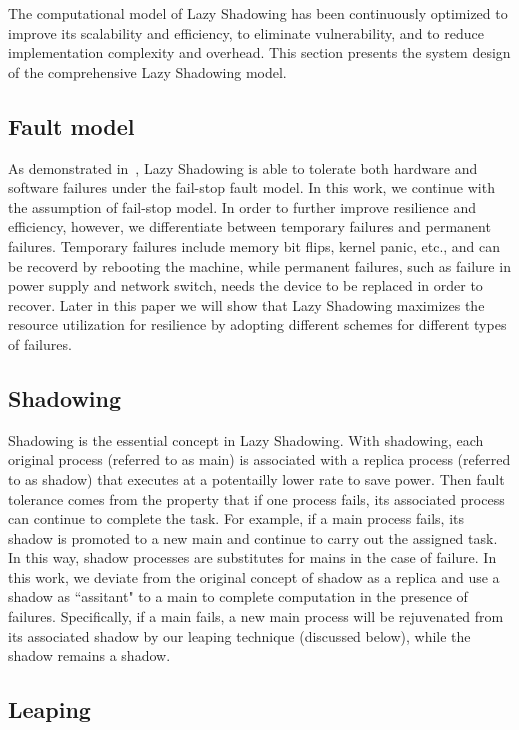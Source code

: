 The computational model of Lazy Shadowing has been continuously optimized to improve its scalability and efficiency, to eliminate vulnerability, and to reduce implementation complexity and overhead. This section presents the system design of the comprehensive Lazy Shadowing model. 

\subsection{Fault model}
 
As demonstrated in~\cite{cui_2016_scalcom}, Lazy Shadowing is able to tolerate both hardware and software failures under the fail-stop fault model. In this work, we continue with the assumption of fail-stop model. In order to further improve resilience and efficiency, however, we differentiate between temporary failures and permanent failures. Temporary failures include memory bit flips, kernel panic, etc., and can be recoverd by rebooting the machine, while permanent failures, such as failure in power supply and network switch, needs the device to be replaced in order to recover. Later in this paper we will show that Lazy Shadowing maximizes the resource utilization for resilience by adopting different schemes for different types of failures. 

\subsection{Shadowing}

Shadowing is the essential concept in  Lazy Shadowing. With shadowing, each original process (referred to as main) is associated with a replica process (referred to as shadow) that executes at a potentailly lower rate to save power. Then fault tolerance comes from the property that if one process fails, its associated process can continue to complete the task. For example, if a main process fails, its shadow is promoted to a new main and continue to carry out the assigned task. In this way, shadow processes are substitutes for mains in the case of failure. In this work, we deviate from the original concept of shadow as a replica and use a shadow as ``assitant" to a main to complete computation in the presence of failures. Specifically, if a main fails, a new main process will be rejuvenated from its associated shadow by our leaping technique (discussed below), while the shadow remains a shadow. 

\subsection{Leaping}


